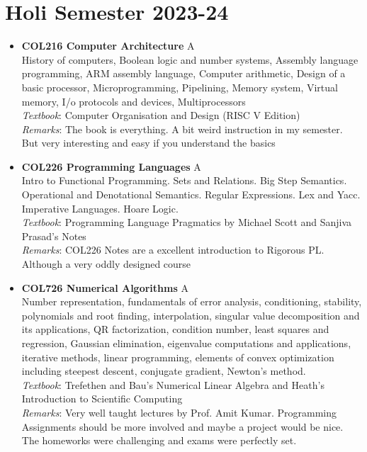 \documentclass[a4paper]{article}
\begin{document}
\section*{Holi Semester 2023-24}
\begin{itemize}

\item \textbf{COL216 Computer Architecture} {\color{red}A}
    \\
    History of computers, Boolean logic and number systems, Assembly language programming, ARM assembly language, Computer arithmetic, Design of a basic processor, Microprogramming, Pipelining, Memory system, Virtual memory, I/o protocols and devices, Multiprocessors
    \\
    \textit{Textbook}: Computer Organisation and Design (RISC V Edition)
    \\
    \textit{Remarks}: The book is everything. A bit weird instruction in my semester. But very interesting and easy if you understand the basics
\item \textbf{COL226 Programming Languages} {\color{red}A}
    \\
    Intro to Functional Programming. Sets and Relations. Big Step Semantics. Operational and Denotational Semantics. Regular Expressions. Lex and Yacc. Imperative Languages. Hoare Logic. 
     \\
    \textit{Textbook}: Programming Language Pragmatics by Michael Scott and Sanjiva Prasad's Notes
    \\
    \textit{Remarks}: COL226 Notes are a excellent introduction to Rigorous PL. Although a very oddly designed course
\item \textbf{COL726 Numerical Algorithms} {\color{red}A}
    \\
    Number representation, fundamentals of error analysis, conditioning, stability, polynomials and root finding, interpolation, singular value decomposition and its applications, QR factorization, condition number, least squares and regression, Gaussian elimination, eigenvalue computations and applications, iterative methods, linear programming, elements of convex optimization including steepest descent, conjugate gradient, Newton’s method.
     \\
    \textit{Textbook}: Trefethen and Bau's Numerical Linear Algebra and Heath's Introduction to Scientific Computing
    \\
    \textit{Remarks}: Very well taught lectures by Prof. Amit Kumar. Programming Assignments should be more involved and maybe a project would be nice. The homeworks were challenging and exams were perfectly set.

\end{itemize}
\end{document}
